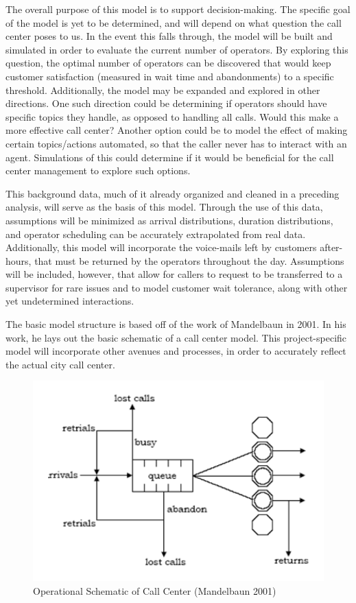 \documentclass[11pt,twocolumn]{article}
\begin{document}
\par
The overall purpose of this model is to support decision-making.  The specific goal of the model is yet to be determined, and will depend on what question the call center poses to us.  In the event this falls through, the model will be built and simulated in order to evaluate the current number of operators.  By exploring this question, the optimal number of operators can be discovered that would keep customer satisfaction (measured in wait time and abandonments) to a specific threshold.  Additionally, the model may be expanded and explored in other directions. One such direction could be determining if operators should have specific topics they handle, as opposed to handling all calls.  Would this make a more effective call center?  Another option could be to model the effect of making certain topics/actions automated, so that the caller never has to interact with an agent.  Simulations of this could determine if it would be beneficial for the call center management to explore such options.
\par
This background data, much of it already organized and cleaned in a preceding analysis, will serve as the basis of this model.  Through the use of this data, assumptions will be minimized as arrival distributions, duration distributions, and operator scheduling can be accurately extrapolated from real data.  Additionally, this model will incorporate the voice-mails left by customers after-hours, that must be returned by the operators throughout the day.  Assumptions will be included, however, that allow for callers to request to be transferred to a supervisor for rare issues and to model customer wait tolerance, along with other yet undetermined interactions.
\par
The basic model structure is based off of the work of Mandelbaun in 2001.  In his work, he lays out the basic schematic of a call center model.\cite{mandelbaun}  This project-specific model will incorporate other avenues and processes, in order to accurately reflect the actual city call center.

\begin{figure}[h]
	\includegraphics[scale=.45]{call_center_layout.png}
	\caption{Operational Schematic of Call Center (Mandelbaun 2001)}
\end{figure}
\end{document}
